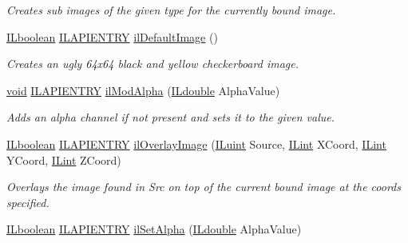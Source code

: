 \begin{DoxyCompactItemize}
\begin{DoxyCompactList}\small\item\em Creates sub images of the given type for the currently bound image. \end{DoxyCompactList}\item 
\hyperlink{group__il__types_gaa6aa7c95cfdc06b4d8601ef832b7bb0a}{I\+Lboolean} \hyperlink{_i_l_8h_a69c08a8d06df986f7e46f209d131ef2f}{I\+L\+A\+P\+I\+E\+N\+T\+R\+Y} \hyperlink{group__image__manip_ga3084506414c867df1f37234d996e2501}{il\+Default\+Image} ()
\begin{DoxyCompactList}\small\item\em Creates an ugly 64x64 black and yellow checkerboard image. \end{DoxyCompactList}\item 
\hyperlink{_i_l_8h_a5530e04d947bcddd83639ea7940faf10}{void} \hyperlink{_i_l_8h_a69c08a8d06df986f7e46f209d131ef2f}{I\+L\+A\+P\+I\+E\+N\+T\+R\+Y} \hyperlink{group__image__manip_gaca8654129c04ebccba49f71d7e13edfe}{il\+Mod\+Alpha} (\hyperlink{group__il__types_ga3896ba656038eb34345347cd095b020a}{I\+Ldouble} Alpha\+Value)
\begin{DoxyCompactList}\small\item\em Adds an alpha channel if not present and sets it to the given value. \end{DoxyCompactList}\item 
\hyperlink{group__il__types_gaa6aa7c95cfdc06b4d8601ef832b7bb0a}{I\+Lboolean} \hyperlink{_i_l_8h_a69c08a8d06df986f7e46f209d131ef2f}{I\+L\+A\+P\+I\+E\+N\+T\+R\+Y} \hyperlink{group__image__manip_ga2e07d47b40a202e9fdf26d49e8dcdd4c}{il\+Overlay\+Image} (\hyperlink{group__il__types_gaff8e86a1072c8d7cfe387fb87c6ed8e1}{I\+Luint} Source, \hyperlink{group__il__types_ga8effe51a00daaa0878631e5af75a36cb}{I\+Lint} X\+Coord, \hyperlink{group__il__types_ga8effe51a00daaa0878631e5af75a36cb}{I\+Lint} Y\+Coord, \hyperlink{group__il__types_ga8effe51a00daaa0878631e5af75a36cb}{I\+Lint} Z\+Coord)
\begin{DoxyCompactList}\small\item\em Overlays the image found in Src on top of the current bound image at the coords specified. \end{DoxyCompactList}\item 
\hyperlink{group__il__types_gaa6aa7c95cfdc06b4d8601ef832b7bb0a}{I\+Lboolean} \hyperlink{_i_l_8h_a69c08a8d06df986f7e46f209d131ef2f}{I\+L\+A\+P\+I\+E\+N\+T\+R\+Y} \hyperlink{group__image__manip_ga8887f494b3ed8dc889e783d5e3e3865f}{il\+Set\+Alpha} (\hyperlink{group__il__types_ga3896ba656038eb34345347cd095b020a}{I\+Ldouble} Alpha\+Value)

\end{DoxyCompactItemize}
